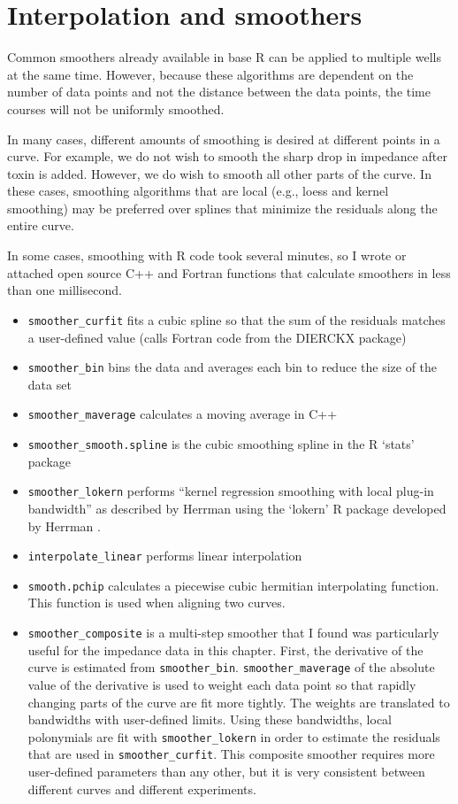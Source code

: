\section{Interpolation and smoothers}

Common smoothers already available in base R can be applied to multiple
wells at the same time. However, because these algorithms
are dependent on the number of data points and not the distance between
the data points, the time courses will not 
be uniformly smoothed.

In many cases, different amounts of smoothing is desired at different
points in a curve. For example, we do not wish to smooth the sharp drop in
impedance after toxin is added. However, we do wish to smooth all other 
parts of the curve. In these cases, smoothing algorithms that are local (e.g., loess
and kernel smoothing) may be preferred over splines that minimize the residuals along
the entire curve.

In some cases, smoothing with R code took several minutes, so I wrote or attached open source
C++ and Fortran functions that calculate smoothers in less than one millisecond.


\begin{itemize}
  \item \texttt{smoother\_curfit} fits a cubic spline so that the sum of the residuals
matches a user-defined value (calls Fortran code from the DIERCKX package)
  \item \texttt{smoother\_bin} bins the data and averages each bin to reduce the size of the data set
  \item \texttt{smoother\_maverage} calculates a moving average in C++
  \item \texttt{smoother\_smooth.spline} is the cubic smoothing spline in the R `stats' package
  \item \texttt{smoother\_lokern} performs ``kernel regression smoothing with local plug-in bandwidth''
     as described by Herrman using the `lokern' R package developed by Herrman \cite{Herrmann:1997gx}.
  \item \texttt{interpolate\_linear} performs linear interpolation
  \item \texttt{smooth.pchip} calculates a piecewise cubic hermitian interpolating function. This
     function is used when aligning two curves.
  \item \texttt{smoother\_composite} is a multi-step smoother that I found was particularly
     useful for the impedance data in this chapter. First, the derivative
     of the curve is estimated from \texttt{smoother\_bin}.
     \texttt{smoother\_maverage} of the absolute value of the derivative is used to weight each data
     point so that rapidly changing parts of the curve are fit more tightly.
     The weights are translated to bandwidths with user-defined limits. 
     Using these bandwidths, local polonymials are fit with \texttt{smoother\_lokern} in order to estimate
     the residuals that are used in \texttt{smoother\_curfit}. This composite smoother requires
     more user-defined parameters than any other, but it is very consistent
     between different curves and different experiments.
\end{itemize}

